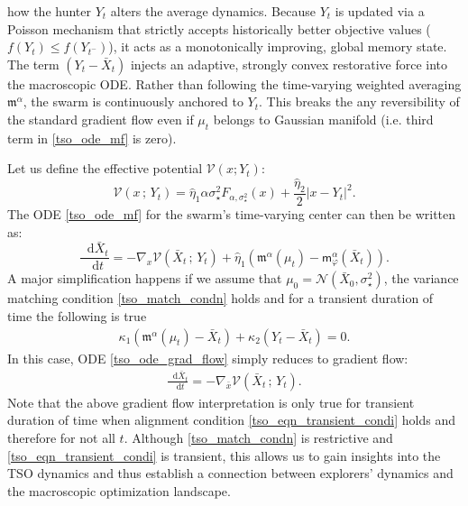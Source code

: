 \documentclass{article}
\def\m{\mathfrak{m}}
\newcommand*\der{\mathop{}\!\mathrm{d}}
\numberwithin{equation}{section}
\begin{document}
how the hunter $Y_t$ alters the average dynamics. Because $Y_t$ is updated via a Poisson mechanism that strictly accepts historically better objective values ($f(Y_t) \le f(Y_{t^-})$), it acts as a monotonically improving, global memory state.  The term $(Y_t - \bar{X}_t)$ injects an adaptive, strongly convex restorative force into the macroscopic ODE. Rather than following the time-varying weighted averaging $\m^\alpha$, the swarm is continuously anchored to $Y_t$. This breaks the any reversibility of the standard gradient flow even if $\mu_t$ belongs to Gaussian manifold (i.e. third term in \eqref{tso_ode_mf} is zero). %


Let us define the  effective potential $\mathcal{V}(x; Y_t)$:
\begin{equation}
    \mathcal{V}(x\,;\, Y_t) = \hat{\eta}_1 \alpha \sigma_\star^2 F_{\alpha,\sigma_\star^2}(x) + \frac{\hat{\eta}_2}{2}|x - Y_t|^2.
\end{equation}
The ODE \eqref{tso_ode_mf} for the swarm's time-varying center can then be written as:
\begin{equation}\label{tso_ode_grad_flow}
    \frac{\der \bar{X}_t}{\der t} = -\nabla_x \mathcal{V}(\bar{X}_t\,;\, Y_t) +  \hat{\eta}_1(\m^\alpha(\mu_t) - \mathsf{m}^{\alpha}_\varphi(\bar{X}_t)).
\end{equation} 
A major simplification happens if we assume that $\mu_0 = \mathcal{N}(\bar{X}_0, \sigma_\star^2)$, the variance matching condition \eqref{tso_match_condn} holds and for a transient duration of time the following is true 
\begin{align}\label{tso_eqn_transient_condi}
    \kappa_1 ( \m^\alpha(\mu_t) -  \bar{X}_t) + \kappa_2 (Y_t - \bar{X}_t) = 0. 
\end{align}
 In this case, ODE \eqref{tso_ode_grad_flow} simply reduces to gradient flow:
 \begin{align}
      \frac{\der \bar{X}_t}{\der t} = -\nabla_{\bar{x}} \mathcal{V}(\bar{X}_t\,;\, Y_t).
 \end{align}
 Note that the above gradient flow interpretation is only true for transient duration of time when alignment condition \eqref{tso_eqn_transient_condi} holds  and therefore for not all $t$. Although \eqref{tso_match_condn} is restrictive and  \eqref{tso_eqn_transient_condi} is transient, this allows us to gain insights into the TSO dynamics and thus establish  a connection between explorers' dynamics and the macroscopic optimization landscape. 
\end{document}
